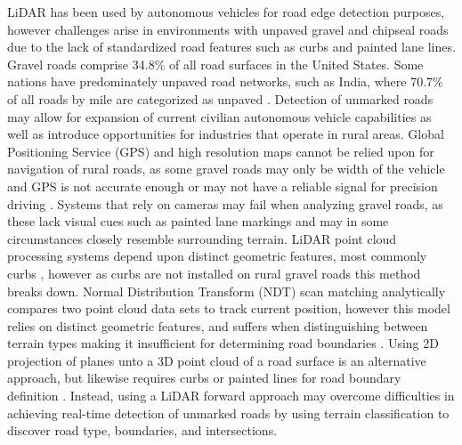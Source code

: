 \documentclass[journal,onecolumn]{IEEEtran}
\begin{document}
	{LiDAR has been used by autonomous vehicles for road edge detection purposes, however challenges arise in environments with unpaved gravel and chipseal roads due to the lack of standardized road features such as curbs and painted lane lines. Gravel roads comprise 34.8\% \cite{road_stats_2} of all road surfaces in the United States. Some nations have predominately unpaved road networks, such as India, where 70.7\% of all roads by mile are categorized as unpaved \cite{malik_lal_2019}. Detection of unmarked roads may allow for expansion of current civilian autonomous vehicle capabilities as well as introduce opportunities for industries that operate in rural areas. Global Positioning Service (GPS) and high resolution maps cannot be relied upon for navigation of rural roads, as some gravel roads may only be width of the vehicle and GPS is not accurate enough or may not have a reliable signal for precision driving \cite{noauthor_gpsgov_nodate}. Systems that rely on cameras may fail when analyzing gravel roads, as these lack visual cues such as painted lane markings \cite{crisman_scarf_1993} and may in some circumstances closely resemble surrounding terrain. LiDAR point cloud processing systems depend upon distinct geometric features, most commonly curbs \cite{yadav_extraction_2017,liu_new_2013,qiu_fast_2016,fernandes_road_2014,seker_experiments_nodate,yang_semi-automated_2013,miyazaki_line-based_2014,hervieu_road_2013,smadja_road_nodate}, however as curbs are not installed on rural gravel roads \cite{skorseth_gravel_nodate} this method breaks down. Normal Distribution Transform (NDT) scan matching analytically compares two point cloud data sets to track current position, however this model relies on distinct geometric features, and suffers when distinguishing between terrain types making it insufficient for determining road boundaries \cite{biber_normal_2003}. Using 2D projection of planes unto a 3D point cloud of a road surface is an alternative approach, but likewise requires curbs or painted lines for road boundary definition \cite{fernandes_road_2014, borkar_robust_2009-1, guo_lane_2015}. Instead, using a LiDAR forward approach may overcome difficulties in achieving real-time detection of unmarked roads by using terrain classification to discover road type, boundaries, and intersections.} 
	
	

	
\end{document}
